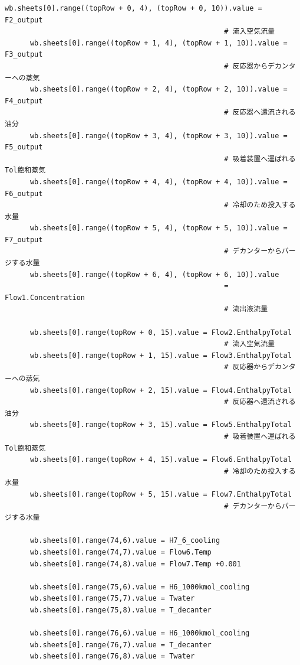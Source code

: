 \documentclass[a4j]{jsreport}
\begin{document}
\begin{lstlisting}[caption=気液反応器の解析(迅速に平衡)]
      wb.sheets[0].range((topRow + 0, 4), (topRow + 0, 10)).value = F2_output
                                                    # 流入空気流量
      wb.sheets[0].range((topRow + 1, 4), (topRow + 1, 10)).value = F3_output
                                                    # 反応器からデカンターへの蒸気
      wb.sheets[0].range((topRow + 2, 4), (topRow + 2, 10)).value = F4_output
                                                    # 反応器へ還流される油分
      wb.sheets[0].range((topRow + 3, 4), (topRow + 3, 10)).value = F5_output
                                                    # 吸着装置へ運ばれるTol飽和蒸気
      wb.sheets[0].range((topRow + 4, 4), (topRow + 4, 10)).value = F6_output
                                                    # 冷却のため投入する水量
      wb.sheets[0].range((topRow + 5, 4), (topRow + 5, 10)).value = F7_output
                                                    # デカンターからパージする水量
      wb.sheets[0].range((topRow + 6, 4), (topRow + 6, 10)).value
                                                    = Flow1.Concentration
                                                    # 流出液流量

      wb.sheets[0].range(topRow + 0, 15).value = Flow2.EnthalpyTotal
                                                    # 流入空気流量
      wb.sheets[0].range(topRow + 1, 15).value = Flow3.EnthalpyTotal
                                                    # 反応器からデカンターへの蒸気
      wb.sheets[0].range(topRow + 2, 15).value = Flow4.EnthalpyTotal
                                                    # 反応器へ還流される油分
      wb.sheets[0].range(topRow + 3, 15).value = Flow5.EnthalpyTotal
                                                    # 吸着装置へ運ばれるTol飽和蒸気
      wb.sheets[0].range(topRow + 4, 15).value = Flow6.EnthalpyTotal
                                                    # 冷却のため投入する水量
      wb.sheets[0].range(topRow + 5, 15).value = Flow7.EnthalpyTotal
                                                    # デカンターからパージする水量

      wb.sheets[0].range(74,6).value = H7_6_cooling
      wb.sheets[0].range(74,7).value = Flow6.Temp
      wb.sheets[0].range(74,8).value = Flow7.Temp +0.001

      wb.sheets[0].range(75,6).value = H6_1000kmol_cooling
      wb.sheets[0].range(75,7).value = Twater
      wb.sheets[0].range(75,8).value = T_decanter

      wb.sheets[0].range(76,6).value = H6_1000kmol_cooling
      wb.sheets[0].range(76,7).value = T_decanter
      wb.sheets[0].range(76,8).value = Twater
\end{lstlisting}
\end{document}
